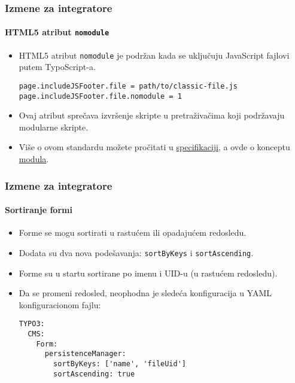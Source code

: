 
\begin{frame}[fragile]
	\frametitle{Izmene za integratore}
	\framesubtitle{HTML5 atribut \texttt{nomodule}}

	\lstset{basicstyle=\tiny\ttfamily}

	\begin{itemize}
		\item HTML5 atribut \texttt{nomodule} je podržan kada se uključuju JavaScript fajlovi putem TypoScript-a.
\begin{lstlisting}
page.includeJSFooter.file = path/to/classic-file.js
page.includeJSFooter.file.nomodule = 1
\end{lstlisting}

		\item Ovaj atribut sprečava izvršenje skripte u pretraživačima koji podržavaju modularne skripte.

		\item Više o ovom standardu možete pročitati u
			\href{https://html.spec.whatwg.org/multipage/scripting.html#attr-script-nomodule}{specifikaciji},
			a ovde o konceptu \href{https://hacks.mozilla.org/2015/08/es6-in-depth-modules/}{modula}.

	\end{itemize}


\end{frame}


\begin{frame}[fragile]
	\frametitle{Izmene za integratore}
	\framesubtitle{Sortiranje formi}

	\lstset{basicstyle=\tiny\ttfamily}

	\begin{itemize}
		\item Forme se mogu sortirati u rastućem ili opadajućem redosledu.
		\item Dodata su dva nova podešavanja: \texttt{sortByKeys} i \texttt{sortAscending}.
		\item Forme su u startu sortirane po imenu i UID-u (u rastućem redosledu).
		\item Da se promeni redosled, neophodna je sledeća konfiguracija u YAML konfiguracionom fajlu:
\begin{lstlisting}
TYPO3:
  CMS:
    Form:
      persistenceManager:
        sortByKeys: ['name', 'fileUid']
        sortAscending: true
\end{lstlisting}

	\end{itemize}

\end{frame}

